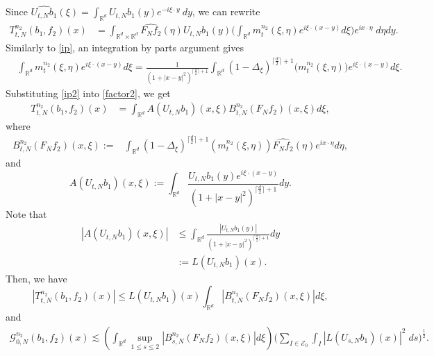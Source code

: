 \documentclass[a4paper,reqno]{amsart}
\numberwithin{equation}{section}
\newcommand{\R}{{\mathbb {R}}}
\begin{document}
	Since $\widehat{U_{t,N}b_1}(\xi)=\int_{\R^d}U_{t,N}b_1(y)e^{-i\xi\cdot y}~dy$, we can rewrite
	\begin{align}\label{factor2}
		T^{n_2}_{t,N}(b_1,f_2)(x)&=\int_{\R^d\times\R^d}\widehat{F_Nf_2}(\eta)U_{t,N}b_1(y)\Big(\int_{\R^d}m^{n_2}_{t}(\xi, \eta)e^{i\xi\cdot(x-y)}d\xi\Big)e^{ix\cdot\eta}\;d\eta dy.
	\end{align}
	Similarly to \eqref{ip}, an integration by parts argument gives
	\begin{align}\label{ip2}
		&\int_{\R^d}m^{n_2}_{t}(\xi, \eta)e^{i\xi\cdot(x-y)}d\xi=\frac{1}{(1+|x-y|^2)^{\lceil\frac{d}{2}\rceil+1}}\int_{\R^d}(1-\Delta_\xi)^{\lceil\frac{d}{2}\rceil+1}\Big(m^{n_2}_{t}(\xi, \eta)\Big)e^{i\xi\cdot(x-y)}d\xi.
	\end{align}
	Substituting \eqref{ip2} into \eqref{factor2}, we get
	\begin{align*}
		T^{n_2}_{t,N}(b_1,f_2)(x)&=\int_{\mathbb{R}^{d}}A\left(U_{t,N}b_1\right)(x,\xi) B^{n_2}_{t, N}\left(F_{N}f_2\right)(x, \xi) d \xi,
	\end{align*}
	where
	\begin{align*}\label{operatorB2}
		B^{n_2}_{t, N}\left(F_{N}f_2\right)(x, \xi):=&\int_{\mathbb{R}^{d}} \left(1- \Delta_{\xi}\right)^{\lceil \frac{d}{2}\rceil+1}\left(m^{n_2}_{t}(\xi, \eta)\right)\widehat{F_{N}f_2}(\eta)e^{ix \cdot \eta} d\eta,
	\end{align*}
	and
	\[A\left(U_{t, N}b_1\right)(x,\xi):=\int_{\mathbb{R}^{d}} \frac{U_{t, N}b_1(y)e^{i\xi\cdot(x-y)}}{\left(1+\left|x-y\right|^{2}\right)^{\lceil \frac{d}{2}\rceil+1}} d y.\]
	Note that
	\begin{align*}
		|A\left(U_{t, N}b_1\right)(x,\xi)|&\leq\int_{\mathbb{R}^{d}} \frac{|U_{t, N}b_1(y)|}{\left(1+\left|x-y\right|^{2}\right)^{\lceil \frac{d}{2}\rceil+1}} d y\\
		&:=L\left(U_{t,N}b_1\right)(x).
	\end{align*}
	Then, we have
	\begin{equation*}\label{decomposition2}
		|T^{n_2}_{t,N}(b_1,f_2)(x)|\leq L\left(U_{t,N}b_1\right)(x) \int_{\mathbb{R}^{d}}\left|B^{n_2}_{t, N}\left(F_{N}f_2\right)(x, \xi)\right| d\xi,
	\end{equation*}
	and
	\begin{align*}
		\mathcal{G}^{n_2}_{0,N}(b_1,f_2)(x)\lesssim\left(\int_{\mathbb{R}^{d}} \sup_{1 \leq s\leq 2}\left|B^{n_2}_{s, N}\left(F_Nf_2\right)(x, \xi)\right| d \xi\right)\bigg(\sum_{I\in \mathcal{E}_0}\int_I\left|L\left(U_{s,N}b_1\right)(x)\right|^2\;ds\bigg)^\frac{1}{2}.
	\end{align*}
\end{document}
